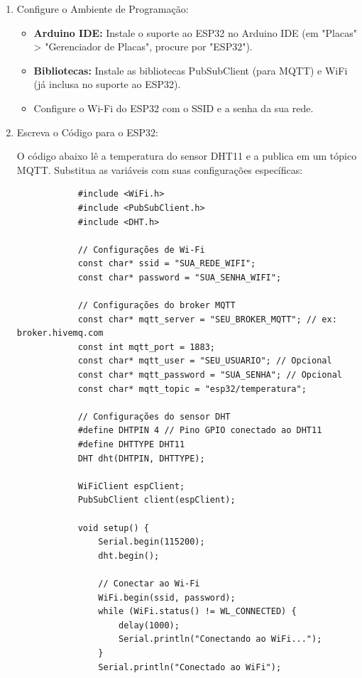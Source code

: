 \documentclass[a4paper]{article}
\begin{document}
\begin{answer}
\begin{enumerate}
            \item Configure o Ambiente de Programação:
            
            \begin{itemize}
                \item \textbf{Arduino IDE:} Instale o suporte ao ESP32 no Arduino IDE (em "Placas" > "Gerenciador de Placas", procure por "ESP32").
                \item \textbf{Bibliotecas:} Instale as bibliotecas PubSubClient (para MQTT) e WiFi (já inclusa no suporte ao ESP32).
                \item Configure o Wi-Fi do ESP32 com o SSID e a senha da sua rede.
            \end{itemize}

            \item Escreva o Código para o ESP32:
            
            O código abaixo lê a temperatura do sensor DHT11 e a publica em um tópico MQTT. Substitua as variáveis com suas configurações específicas:
            \begin{verbatim}
            #include <WiFi.h>
            #include <PubSubClient.h>
            #include <DHT.h>

            // Configurações de Wi-Fi
            const char* ssid = "SUA_REDE_WIFI";
            const char* password = "SUA_SENHA_WIFI";

            // Configurações do broker MQTT
            const char* mqtt_server = "SEU_BROKER_MQTT"; // ex: broker.hivemq.com
            const int mqtt_port = 1883;
            const char* mqtt_user = "SEU_USUARIO"; // Opcional
            const char* mqtt_password = "SUA_SENHA"; // Opcional
            const char* mqtt_topic = "esp32/temperatura";

            // Configurações do sensor DHT
            #define DHTPIN 4 // Pino GPIO conectado ao DHT11
            #define DHTTYPE DHT11
            DHT dht(DHTPIN, DHTTYPE);

            WiFiClient espClient;
            PubSubClient client(espClient);

            void setup() {
                Serial.begin(115200);
                dht.begin();

                // Conectar ao Wi-Fi
                WiFi.begin(ssid, password);
                while (WiFi.status() != WL_CONNECTED) {
                    delay(1000);
                    Serial.println("Conectando ao WiFi...");
                }
                Serial.println("Conectado ao WiFi");


\end{verbatim}
\end{enumerate}
\end{answer}
\end{document}
